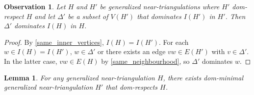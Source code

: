 \documentclass[12pt]{article}
\newtheorem{obs}{Observation}
\newtheorem{lem}{Lemma}
\theoremstyle{definition}
\begin{document}
\begin{obs}
  Let $H$ and $H'$ be generalized near-triangulations where $H'$ dom-respect $H$ and let $\Delta'$ be a subset of $V(H')$ that dominates $I(H')$ in $H'$.  Then $\Delta'$ dominates $I(H)$ in $H$.
\end{obs}

\begin{proof}
  By \cref{same_inner_vertices}, $I(H)=I(H')$. For each $w\in I(H)=I(H')$, $w\in \Delta'$ or there exists an edge $vw\in E(H')$ with $v\in\Delta'$.  In the latter case, $vw\in E(H)$ by \cref{same_neighbourhood}, so $\Delta'$ dominates $w$.
\end{proof}

\begin{lem}\label{dom_minimal}
  For any generalized near-triangulation $H$, there exists dom-minimal generalized near-triangulation $H'$ that dom-respects $H$.
\end{lem}
\end{document}
